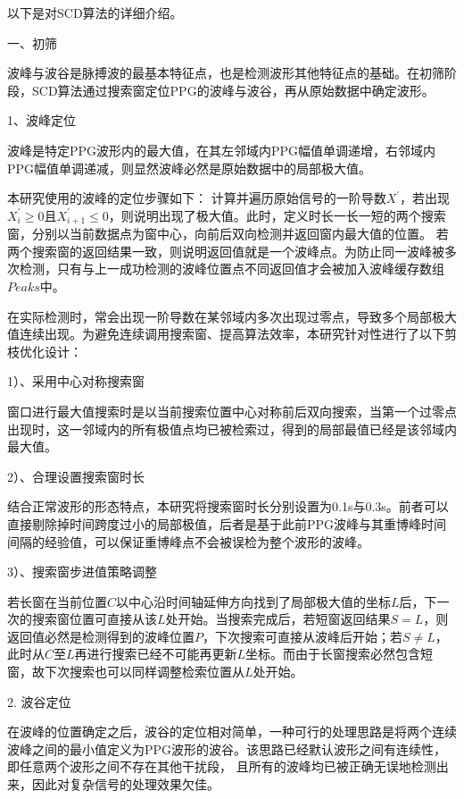 以下是对SCD算法的详细介绍。

一、初筛

波峰与波谷是脉搏波的最基本特征点，也是检测波形其他特征点的基础。在初筛阶段，SCD算法通过搜索窗定位PPG的波峰与波谷，再从原始数据中确定波形。

1、波峰定位

波峰是特定PPG波形内的最大值，在其左邻域内PPG幅值单调递增，右邻域内PPG幅值单调递减，则显然波峰必然是原始数据中的局部极大值。

本研究使用的波峰的定位步骤如下：
计算并遍历原始信号的一阶导数$X^{'}$，若出现$X_i^{'}\ge 0$且$X_{i+1}^{'}\le 0$，则说明出现了极大值。此时，定义时长一长一短的两个搜索窗，分别以当前数据点为窗中心，向前后双向检测并返回窗内最大值的位置。
若两个搜索窗的返回结果一致，则说明返回值就是一个波峰点。为防止同一波峰被多次检测，只有与上一成功检测的波峰位置点不同返回值才会被加入波峰缓存数组$Peaks$中。

在实际检测时，常会出现一阶导数在某邻域内多次出现过零点，导致多个局部极大值连续出现。为避免连续调用搜索窗、提高算法效率，本研究针对性进行了以下剪枝优化设计：

1）、采用中心对称搜索窗

窗口进行最大值搜索时是以当前搜索位置中心对称前后双向搜索，当第一个过零点出现时，这一邻域内的所有极值点均已被检索过，得到的局部最值已经是该邻域内最大值。

2）、合理设置搜索窗时长

结合正常波形的形态特点，本研究将搜索窗时长分别设置为0.1s与0.3s。前者可以直接剔除掉时间跨度过小的局部极值，后者是基于此前PPG波峰与其重博峰时间间隔的经验值，可以保证重博峰点不会被误检为整个波形的波峰。

3）、搜索窗步进值策略调整

若长窗在当前位置$C$以中心沿时间轴延伸方向找到了局部极大值的坐标$L$后，下一次的搜索窗位置可直接从该$L$处开始。当搜索完成后，若短窗返回结果$S=L$，则返回值必然是检测得到的波峰位置$P$，下次搜索可直接从波峰后开始；若$S\ne L$，
此时从$C$至$L$再进行搜索已经不可能再更新$L$坐标。而由于长窗搜索必然包含短窗，故下次搜索也可以同样调整检索位置从$L$处开始。

2. 波谷定位

在波峰的位置确定之后，波谷的定位相对简单，一种可行的处理思路是将两个连续波峰之间的最小值定义为PPG波形的波谷。该思路已经默认波形之间有连续性，即任意两个波形之间不存在其他干扰段，
且所有的波峰均已被正确无误地检测出来，因此对复杂信号的处理效果欠佳。

